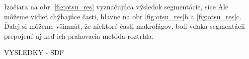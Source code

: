 \documentclass[a4paper,11pt,oneside]{article}%
\begin{document}
Izočiara na obr. \ref{fig:otsu_res} vyznačujúca výsledok segmentácie, síce  Ale môžeme vidieť chýbajúce časti, hlavne na  obr \ref{fig:otsu_res}b a \ref{fig:otsu_res}c. Ďalej si môžeme všimnúť, že niektoré časti makrofágov, boli vďaka segmentácii prepojené aj keď ich prahovacia metóda roztrhla.


VYSLEDKY - SDF
\begin{figure}[H]  
    \hspace{5px}

\end{figure}
\end{document}
